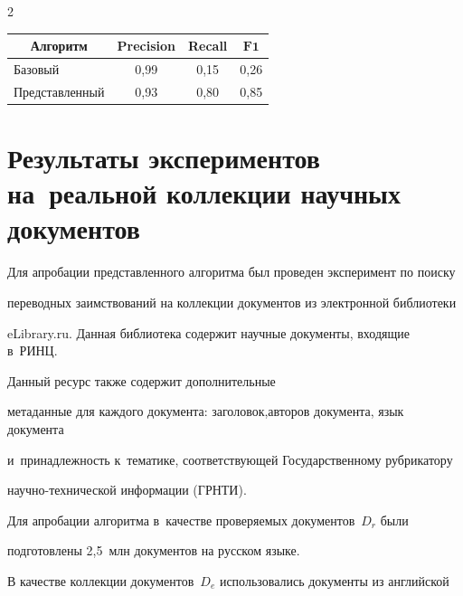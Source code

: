\begin{multicols}{2}
\begin{center}
{\begin{tabular}{|l|c|c|c|}
\hline 


\multicolumn{1}{|c|}{\bf Алгоритм} &  \bf Precision & \bf Recall  &  $\mathbf{F1}$ \\\hline


Базовый &  0,99 & 0,15 & 0,26 \\




Представленный &  0,93 & 0,80 & 0,85 \\


\hline


\end{tabular}


}


\end{center}







\section{Результаты экспериментов на~реальной коллекции научных документов}





Для апробации представленного алгоритма был проведен эксперимент по поиску 


переводных заимствований на коллекции документов из электронной биб\-лио\-те\-ки 


{\sf eLibrary.ru}. Данная биб\-лио\-те\-ка содержит научные документы, входящие в~РИНЦ. 


Данный ресурс также содержит дополнительные\linebreak 


метаданные для каждого документа: заголовок,\linebreak авторов документа, язык документа 


и~принадлежность к~тематике, соответствующей Государственному рубрикатору 


на\-уч\-но-тех\-ни\-че\-ской информации (ГРНТИ).


Для апробации алгоритма в~качестве проверяемых документов~$D_r$ были 


подготовлены 2,5~млн документов на русском языке.





В качестве коллекции документов~$D_e$ использовались документы из английской 



\end{multicols}
